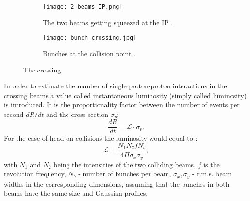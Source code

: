	\begin{figure}[htbp]
	\begin{subfigure}[t]{0.48\textwidth}
		\texttt{[image: 2-beams-IP.png]}
		\caption[Two beams]{The two beams getting squeezed at the IP \cite{2beams}.}
		\label{fig::2beams}
	\end{subfigure}
	\hfill
	\begin{subfigure}[t]{0.48\textwidth}
		\texttt{[image: bunch\_crossing.jpg]}
		\caption[Bunches colliding]{Bunches at the collision point \cite{collisions}.}
		\label{fig::bunches_collision}
	\end{subfigure}
	\caption{The crossing}
	\label{fig::interaction_point}
	\end{figure}
	In order to estimate the number of single proton-proton interactions in the crossing beams a value called instantaneous luminosity (simply called luminosity) is introduced. It is the proportionality factor between the number of events per second $dR/dt$ and the cross-section $\sigma_p$:
	 \begin{equation}
	\nonumber
	\frac{dR}{dt} = \mathcal{L} \cdot \sigma_p.
	\end{equation}
	For the case of head-on collisions the luminosity would equal to \cite{Lumi}:
	\begin{equation}
	\mathcal{L} = \frac{N_1N_2fN_b}{4\Pi \sigma_x \sigma_y},
	\end{equation}
	with $N_1$ and $N_2$ being the intensities of the two colliding beams, $f$ is the revolution frequency, $N_b$ - number of bunches per beam, $ \sigma_x,\sigma_y$ - r.m.s. beam widths in the corresponding dimensions, assuming that the bunches in both beams have the same size and Gaussian profiles. \\

